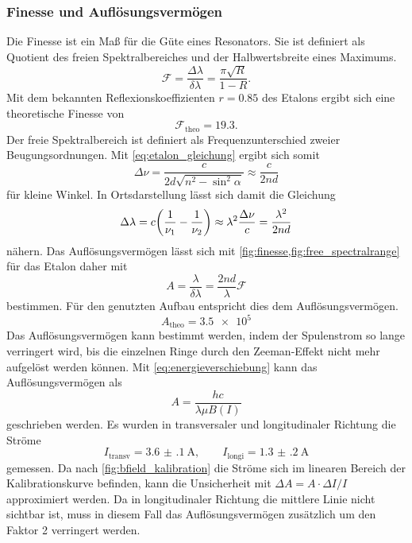 \subsubsection{Finesse und Auflösungsvermögen}
Die Finesse ist ein Maß für die Güte eines Resonators. Sie ist definiert als Quotient 
des freien Spektralbereiches und der Halbwertsbreite eines Maximums. 
\begin{equation}
    \mathcal F = \frac{\Delta\lambda}{\delta \lambda} = \frac{\pi\sqrt R}{1-R}.
    \label{fig:finesse}
\end{equation}
Mit dem bekannten Reflexionskoeffizienten $r=0.85$ des Etalons ergibt sich eine theoretische Finesse 
von 
\[\mathcal F_\mathrm{theo} = \num{19.3}.\]
Der freie Spektralbereich ist definiert als Frequenzunterschied zweier Beugungsordnungen. 
Mit \cref{eq:etalon_gleichung} ergibt sich somit 
\begin{equation*}
    \Delta\nu = \frac{c}{2d\sqrt{n^2-\sin^2\alpha}} \approx \frac{c}{2nd}
\end{equation*}
für kleine Winkel. In Ortsdarstellung lässt sich damit die Gleichung 
\begin{equation}
    \Delta\lambda = c\qty(\frac{1}{\nu_1} - \frac{1}{\nu_2})\approx \lambda^2\frac{\Delta\nu}{c}
        =  \frac{\lambda^2}{2nd}
    \label{fig:free_spectralrange}
\end{equation}
nähern. Das Auflösungsvermögen lässt sich mit \cref{fig:finesse,fig:free_spectralrange} 
für das Etalon daher mit
\begin{equation}
    A = \frac{\lambda}{\delta\lambda} = \frac{2nd}{\lambda}\mathcal F
    \label{eq:finesse}
\end{equation}
bestimmen. Für den genutzten Aufbau entspricht dies dem Auflösungsvermögen.
\[A_\mathrm{theo} = \num{3.5e5}\]
Das Auflösungsvermögen kann bestimmt werden, indem der Spulenstrom so lange 
verringert wird, bis die einzelnen Ringe durch den Zeeman-Effekt nicht mehr aufgelöst werden 
können. Mit \cref{eq:energieverschiebung} kann das Auflösungsvermögen als 
\[A = \frac{hc}{\lambda\mu B(I)}\]
geschrieben werden. Es wurden in transversaler und longitudinaler Richtung 
die Ströme 
\[I_\mathrm{transv} = \SI{3.6(1)}{\ampere},
\qquad I_\mathrm{longi} = \SI{1.3(2)}{\ampere}\]
gemessen. Da nach \cref{fig:bfield_kalibration} die Ströme sich im linearen Bereich 
der Kalibrationskurve befinden, kann die Unsicherheit mit 
$\Delta A = A\cdot\Delta I/I$
approximiert werden. Da in longitudinaler Richtung die mittlere Linie nicht sichtbar ist, muss 
in diesem Fall das Auflösungsvermögen zusätzlich um den Faktor 2 verringert werden.
